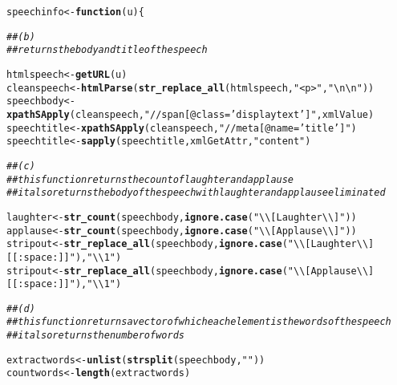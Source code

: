 \documentclass[english]{article}\usepackage[]{graphicx}\usepackage[]{color}
\makeatletter
\newcommand{\hlstr}[1]{\textcolor[rgb]{0.192,0.494,0.8}{#1}}%
\newcommand{\hlcom}[1]{\textcolor[rgb]{0.678,0.584,0.686}{\textit{#1}}}%
\newcommand{\hlstd}[1]{\textcolor[rgb]{0.345,0.345,0.345}{#1}}%
\newcommand{\hlkwa}[1]{\textcolor[rgb]{0.161,0.373,0.58}{\textbf{#1}}}%
\newcommand{\hlkwb}[1]{\textcolor[rgb]{0.69,0.353,0.396}{#1}}%
\newcommand{\hlkwc}[1]{\textcolor[rgb]{0.333,0.667,0.333}{#1}}%
\newcommand{\hlkwd}[1]{\textcolor[rgb]{0.737,0.353,0.396}{\textbf{#1}}}%
\newenvironment{kframe}{%
 \def\at@end@of@kframe{}%
 \ifinner\ifhmode%
  \def\at@end@of@kframe{\end{minipage}}%
  \begin{minipage}{\columnwidth}%
 \fi\fi%
 \def\FrameCommand##1{\hskip\@totalleftmargin \hskip-\fboxsep
 \colorbox{shadecolor}{##1}\hskip-\fboxsep
     \hskip-\linewidth \hskip-\@totalleftmargin \hskip\columnwidth}%
 \MakeFramed {\advance\hsize-\width
   \@totalleftmargin\z@ \linewidth\hsize
   \@setminipage}}%
 {\par\unskip\endMakeFramed%
 \at@end@of@kframe}
\newenvironment{knitrout}{}{} %
\makeatother
\begin{document}
\begin{knitrout}
\color{fgcolor}\begin{kframe}
\begin{alltt}
\hlstd{speechinfo}\hlkwb{<-}\hlkwa{function}\hlstd{(}\hlkwc{u}\hlstd{)\{}

\hlcom{## (b)}
\hlcom{## returns the body and title of the speech}

        \hlstd{htmlspeech}\hlkwb{<-}\hlkwd{getURL}\hlstd{(u)}
        \hlstd{cleanspeech}\hlkwb{<-}\hlkwd{htmlParse}\hlstd{(}\hlkwd{str_replace_all}\hlstd{(htmlspeech,}\hlstr{"<p>"}\hlstd{,} \hlstr{"\textbackslash{}n\textbackslash{}n"}\hlstd{))}
        \hlstd{speechbody}\hlkwb{<-}\hlkwd{xpathSApply}\hlstd{(cleanspeech,}\hlstr{"//span[@class='displaytext']"}\hlstd{,xmlValue)}
        \hlstd{speechtitle}\hlkwb{<-}\hlkwd{xpathSApply}\hlstd{(cleanspeech,} \hlstr{"//meta[@name='title']"}\hlstd{)}
        \hlstd{speechtitle}\hlkwb{<-}\hlkwd{sapply}\hlstd{(speechtitle,xmlGetAttr,}\hlstr{"content"}\hlstd{)}

\hlcom{## (c) }
\hlcom{## this function returns the count of laughter and applause}
\hlcom{## it also returns the body of the speech with laughter and applause eliminated}

        \hlstd{laughter} \hlkwb{<-} \hlkwd{str_count}\hlstd{(speechbody,}\hlkwd{ignore.case}\hlstd{(}\hlstr{"\textbackslash{}\textbackslash{}[Laughter\textbackslash{}\textbackslash{}]"}\hlstd{))}
        \hlstd{applause} \hlkwb{<-} \hlkwd{str_count}\hlstd{(speechbody,}\hlkwd{ignore.case}\hlstd{(}\hlstr{"\textbackslash{}\textbackslash{}[Applause\textbackslash{}\textbackslash{}]"}\hlstd{))}
        \hlstd{stripout} \hlkwb{<-} \hlkwd{str_replace_all}\hlstd{(speechbody,}\hlkwd{ignore.case}\hlstd{(}\hlstr{"\textbackslash{}\textbackslash{}[Laughter\textbackslash{}\textbackslash{}][[:space:]]"}\hlstd{),}\hlstr{"\textbackslash{}\textbackslash{}1"}\hlstd{)}
        \hlstd{stripout} \hlkwb{<-} \hlkwd{str_replace_all}\hlstd{(speechbody,}\hlkwd{ignore.case}\hlstd{(}\hlstr{"\textbackslash{}\textbackslash{}[Applause\textbackslash{}\textbackslash{}][[:space:]]"}\hlstd{),}\hlstr{"\textbackslash{}\textbackslash{}1"}\hlstd{)}

\hlcom{## (d) }
\hlcom{## this function returns a vector of which each element is the words of the speech}
\hlcom{## it also returns the number of words}

        \hlstd{extractwords} \hlkwb{<-} \hlkwd{unlist}\hlstd{(}\hlkwd{strsplit}\hlstd{(speechbody,}\hlstr{" "}\hlstd{))}
        \hlstd{countwords} \hlkwb{<-} \hlkwd{length}\hlstd{(extractwords)}


\end{alltt}
\end{kframe}
\end{knitrout}
\end{document}
